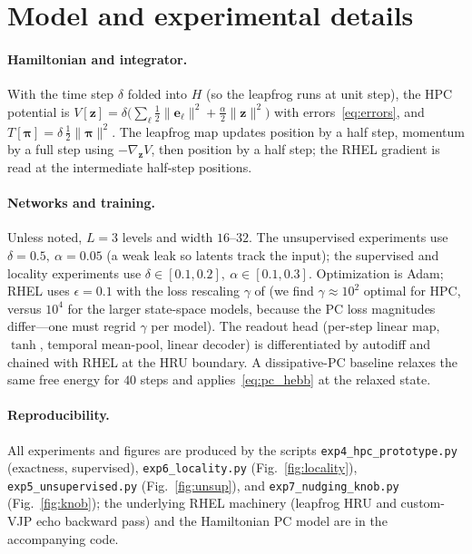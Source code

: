 \documentclass[10pt]{article}
\theoremstyle{remark}
\newcommand{\bz}{\mathbf{z}}
\newcommand{\bpi}{\boldsymbol{\pi}}
\newcommand{\eps}{\epsilon}
\newcommand{\grad}{\nabla}
\newcommand{\half}{\tfrac{1}{2}}
\begin{document}
\appendix
\section{Model and experimental details}
\label{app:details}
\paragraph{Hamiltonian and integrator.} With the time step $\delta$ folded
into $H$ (so the leapfrog runs at unit step), the HPC potential is
$V[\bz]=\delta\big(\sum_\ell\half\|\mathbf{e}_\ell\|^2+\tfrac{\alpha}{2}\|\bz\|^2\big)$
with errors~\eqref{eq:errors}, and $T[\bpi]=\delta\,\half\|\bpi\|^2$. The
leapfrog map updates position by a half step, momentum by a full step using
$-\grad_{\bz}V$, then position by a half step; the RHEL gradient is read at
the intermediate half-step positions.

\paragraph{Networks and training.} Unless noted, $L=3$ levels and width $16$--$32$.
The unsupervised experiments use $\delta=0.5,\ \alpha=0.05$ (a weak leak so
latents track the input); the supervised and locality experiments use
$\delta\in[0.1,0.2],\ \alpha\in[0.1,0.3]$. Optimization is Adam; RHEL uses
$\eps=0.1$ with the loss rescaling $\gamma$ of \citet{rhel} (we find
$\gamma\approx10^2$ optimal for HPC, versus $10^4$ for the larger
state-space models, because the PC loss magnitudes differ---one must regrid
$\gamma$ per model). The readout head (per-step linear map, $\tanh$, temporal
mean-pool, linear decoder) is differentiated by autodiff and chained with
RHEL at the HRU boundary. A dissipative-PC baseline relaxes the same free
energy for $40$ steps and applies~\eqref{eq:pc_hebb} at the relaxed state.

\paragraph{Reproducibility.} All experiments and figures are produced by the
scripts \texttt{exp4\_hpc\_prototype.py} (exactness, supervised),
\texttt{exp6\_locality.py} (Fig.~\ref{fig:locality}),
\texttt{exp5\_unsupervised.py} (Fig.~\ref{fig:unsup}), and
\texttt{exp7\_nudging\_knob.py} (Fig.~\ref{fig:knob}); the underlying RHEL
machinery (leapfrog HRU and custom-VJP echo backward pass) and the
Hamiltonian PC model are in the accompanying code.
\end{document}
